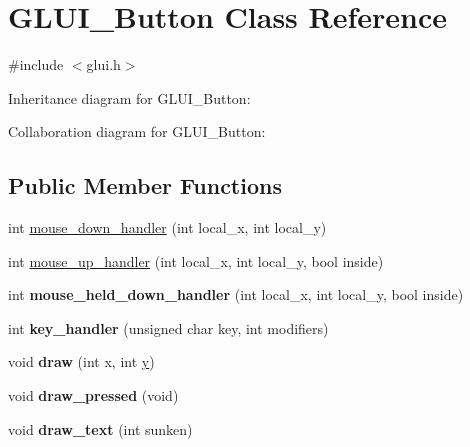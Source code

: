 \hypertarget{class_g_l_u_i___button}{\section{G\+L\+U\+I\+\_\+\+Button Class Reference}
\label{class_g_l_u_i___button}
}


{\ttfamily \#include $<$glui.\+h$>$}



Inheritance diagram for G\+L\+U\+I\+\_\+\+Button\+:


Collaboration diagram for G\+L\+U\+I\+\_\+\+Button\+:
\subsection*{Public Member Functions}
\begin{DoxyCompactItemize}
\item 
int \hyperlink{class_g_l_u_i___button_ad049e31e22fddf61df229c6fcef80f27}{mouse\+\_\+down\+\_\+handler} (int local\+\_\+x, int local\+\_\+y)
\item 
int \hyperlink{class_g_l_u_i___button_a731c78e9ae9fe92fe5e0eba47fc6c0cf}{mouse\+\_\+up\+\_\+handler} (int local\+\_\+x, int local\+\_\+y, bool inside)
\item 
\hypertarget{class_g_l_u_i___button_a38e99372cc0de31dfa784b95e70d1f51}{int {\bfseries mouse\+\_\+held\+\_\+down\+\_\+handler} (int local\+\_\+x, int local\+\_\+y, bool inside)}\label{class_g_l_u_i___button_a38e99372cc0de31dfa784b95e70d1f51}

\item 
\hypertarget{class_g_l_u_i___button_abb99757083838d0f9c87596b512ec5e9}{int {\bfseries key\+\_\+handler} (unsigned char key, int modifiers)}\label{class_g_l_u_i___button_abb99757083838d0f9c87596b512ec5e9}

\item 
\hypertarget{class_g_l_u_i___button_a0b70efaf00fe4eeb26f2675c156fc48f}{void {\bfseries draw} (int x, int \hyperlink{_ice_utils_8h_aa7ffaed69623192258fb8679569ff9ba}{y})}\label{class_g_l_u_i___button_a0b70efaf00fe4eeb26f2675c156fc48f}

\item 
\hypertarget{class_g_l_u_i___button_a445e459227bf0019217ec05e064d3f67}{void {\bfseries draw\+\_\+pressed} (void)}\label{class_g_l_u_i___button_a445e459227bf0019217ec05e064d3f67}

\item 
\hypertarget{class_g_l_u_i___button_a3012a081189288aa6190258f6fd47c9c}{void {\bfseries draw\+\_\+text} (int sunken)}\label{class_g_l_u_i___button_a3012a081189288aa6190258f6fd47c9c}


\end{DoxyCompactItemize}
